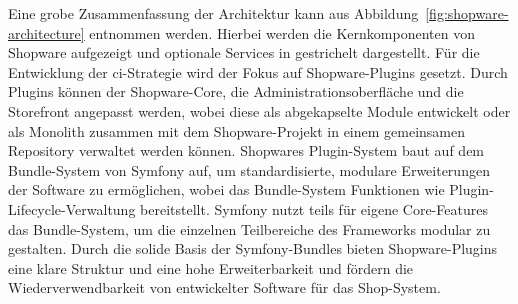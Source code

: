 Eine grobe Zusammenfassung der Architektur kann aus Abbildung\ \ref{fig:shopware-architecture} entnommen werden.
Hierbei werden die Kernkomponenten von Shopware aufgezeigt und optionale Services in gestrichelt dargestellt.
Für die Entwicklung der \acrshort{ci}-Strategie wird der Fokus auf Shopware-Plugins gesetzt.
Durch Plugins können der Shopware-Core, die Administrationsoberfläche und die Storefront angepasst werden, wobei diese
als abgekapselte Module entwickelt oder als Monolith zusammen mit dem Shopware-Projekt in einem gemeinsamen Repository
verwaltet werden können.
Shopwares Plugin-System baut auf dem Bundle-System von Symfony auf, um standardisierte, modulare Erweiterungen der
Software zu ermöglichen, wobei das Bundle-System Funktionen wie Plugin-Lifecycle-Verwaltung bereitstellt.
Symfony nutzt teils für eigene Core-Features das Bundle-System, um die einzelnen Teilbereiche des Frameworks modular zu
gestalten.
Durch die solide Basis der Symfony-Bundles bieten Shopware-Plugins eine klare Struktur und eine hohe Erweiterbarkeit
und fördern die Wiederverwendbarkeit von entwickelter Software für das Shop-System.

\clearpage
